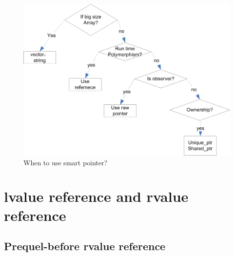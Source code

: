 \documentclass[a4paper,11pt,twoside]{book}
\begin{document}
\begin{itemize}
\begin{figure}[h!]
	\centering
	\includegraphics[width=0.75\linewidth]{pics/smartPointer.png}
	\caption{When to use smart pointer?}
	\label{fig:smartpointer}
\end{figure}
\end{itemize}

\chapter{lvalue reference and rvalue reference}

\section{Prequel-before rvalue reference }
\end{document}
